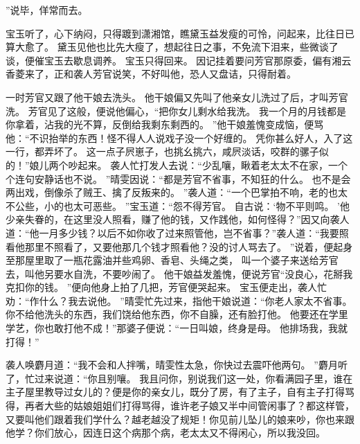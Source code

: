 ”说毕，佯常而去。
\par
宝玉听了，心下纳闷，只得踱到潇湘馆，瞧黛玉益发瘦的可怜，问起来，比往日已算大愈了。
黛玉见他也比先大瘦了，想起往日之事，不免流下泪来，些微谈了谈，便催宝玉去歇息调养。
宝玉只得回来。
因记挂着要问芳官那原委，偏有湘云香菱来了，正和袭人芳官说笑，不好叫他，恐人又盘诘，只得耐着。
\par
一时芳官又跟了他干娘去洗头。
他干娘偏又先叫了他亲女儿洗过了后，才叫芳官洗。
芳官见了这般，便说他偏心，“把你女儿剩水给我洗。
我一个月的月钱都是你拿着，沾我的光不算，反倒给我剩东剩西的。
”他干娘羞愧变成恼，便骂他：“不识抬举的东西！怪不得人人说戏子没一个好缠的。
凭你甚么好人，入了这一行，都弄坏了。
这一点子屄崽子，也挑幺挑六，咸屄淡话，咬群的骡子似的！”娘儿两个吵起来。
袭人忙打发人去说：“少乱嚷，瞅着老太太不在家，一个个连句安静话也不说。
”晴雯因说：“都是芳官不省事，不知狂的什么。
也不是会两出戏，倒像杀了贼王、擒了反叛来的。
”袭人道：“一个巴掌拍不响，老的也太不公些，小的也太可恶些。
”宝玉道：“怨不得芳官。
自古说：‘物不平则鸣。
’他少亲失眷的，在这里没人照看，赚了他的钱，又作践他，如何怪得？”因又向袭人道：“他一月多少钱？以后不如你收了过来照管他，岂不省事？”袭人道：“我要照看他那里不照看了，又要他那几个钱才照看他？没的讨人骂去了。
”说着，便起身至那屋里取了一瓶花露油并些鸡卵、香皂、头绳之类，
叫一个婆子来送给芳官去，叫他另要水自洗，不要吵闹了。
他干娘益发羞愧，便说芳官“没良心，花掰我克扣你的钱。
”便向他身上拍了几把，芳官便哭起来。
宝玉便走出，袭人忙劝：“作什么？我去说他。
”晴雯忙先过来，指他干娘说道：“你老人家太不省事。
你不给他洗头的东西，我们饶给他东西，你不自臊，还有脸打他。
他要还在学里学艺，你也敢打他不成！”那婆子便说：“一日叫娘，终身是母。
他排场我，我就打得！”\par
袭人唤麝月道：“我不会和人拌嘴，晴雯性太急，你快过去震吓他两句。
”麝月听了，忙过来说道：“你且别嚷。
我且问你，别说我们这一处，你看满园子里，谁在主子屋里教导过女儿的？便是你的亲女儿，既分了房，有了主子，自有主子打得骂得，再者大些的姑娘姐姐们打得骂得，谁许老子娘又半中间管闲事了？都这样管，又要叫他们跟着我们学什么？越老越没了规矩！你见前儿坠儿的娘来吵，你也来跟他学？你们放心，因连日这个病那个病，老太太又不得闲心，所以我没回。
